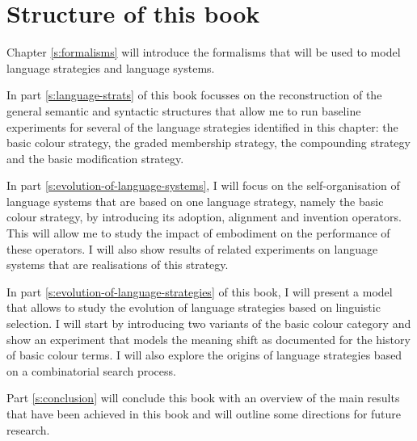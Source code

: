 \section{Structure of this book}

Chapter \ref{s:formalisms} will introduce the formalisms that will be 
used to model language strategies and language systems.

In part \ref{s:language-strats} of this book focusses on the
reconstruction of the general semantic and syntactic structures that
allow me to run baseline experiments for several of the language
strategies identified in this chapter: the basic colour strategy, the
graded membership strategy, the compounding strategy and the
basic modification strategy.

In part \ref{s:evolution-of-language-systems}, I will focus on the
self-organisation of language systems that are based on one language strategy,
namely the basic colour strategy, by introducing its adoption,
alignment and invention operators. This will allow me to study the
impact of embodiment on the performance of these operators. I will
also show results of related experiments on language systems that are
realisations of this strategy.

In part \ref{s:evolution-of-language-strategies} of this book, I
will present a model that allows to study the evolution of language
strategies based on linguistic selection. I will start by introducing
two variants of the basic colour category and show an experiment that
models the meaning shift as documented for the history of basic colour
terms. I will also explore the origins of language strategies based on
a combinatorial search process.

Part \ref{s:conclusion} will conclude this book with an overview of
the main results that have been achieved in this book and will
outline some directions for future research.
